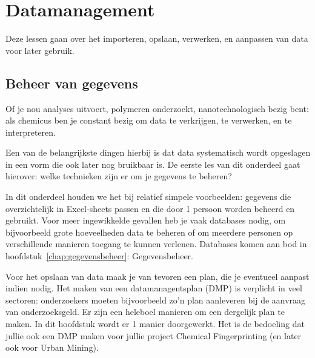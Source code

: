 \chapter{Datamanagement}
\label{chap:datamanagement}
Deze lessen gaan over het importeren, opslaan, verwerken, en aanpassen van data voor later gebruik.

\section{Beheer van gegevens}
Of je nou analyses uitvoert, polymeren onderzoekt, nanotechnologisch bezig bent: als chemicus ben je constant bezig om data te verkrijgen, te verwerken, en te interpreteren. 

Een van de belangrijkste dingen hierbij is dat data systematisch wordt opgeslagen in een vorm die ook later nog bruikbaar is. De eerste les van dit onderdeel gaat hierover: welke technieken zijn er om je gegevens te beheren?

In dit onderdeel houden we het bij relatief simpele voorbeelden: gegevens die overzichtelijk in Excel-sheets passen en die door 1 persoon worden beheerd en gebruikt. Voor meer ingewikkelde gevallen heb je vaak databases nodig, om bijvoorbeeld grote hoeveelheden data te beheren of om meerdere personen op verschillende manieren toegang te kunnen verlenen. Databases komen aan bod in hoofdstuk~\ref{chap:gegevensbeheer}: Gegevensbeheer.

Voor het opslaan van data maak je van tevoren een plan, die je eventueel aanpast indien nodig. Het maken van een datamanagentsplan (DMP) is verplicht in veel sectoren: onderzoekers moeten bijvoorbeeld zo'n plan aanleveren bij de aanvraag van onderzoeksgeld. Er zijn een heleboel manieren om een dergelijk plan te maken. In dit hoofdstuk wordt er 1 manier doorgewerkt. Het is de bedoeling dat jullie ook een DMP maken voor jullie project Chemical Fingerprinting (en later ook voor Urban Mining).

